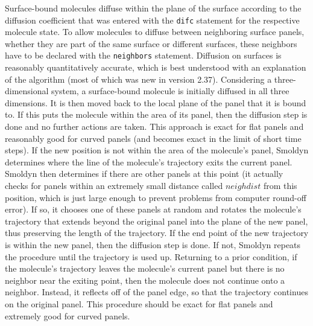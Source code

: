\documentclass {scrbook}
\newcommand {\ttt} {\texttt}
\begin{document}
Surface-bound molecules diffuse within the plane of the surface according to the diffusion coefficient that was entered with the \ttt{difc} statement for the respective molecule state. To allow molecules to diffuse between neighboring surface panels, whether they are part of the same surface or different surfaces, these neighbors have to be declared with the \ttt{neighbors} statement. Diffusion on surfaces is reasonably quantitatively accurate, which is best understood with an explanation of the algorithm (most of which was new in version 2.37). Considering a three-dimensional system, a surface-bound molecule is initially diffused in all three dimensions. It is then moved back to the local plane of the panel that it is bound to. If this puts the molecule within the area of its panel, then the diffusion step is done and no further actions are taken. This approach is exact for flat panels and reasonably good for curved panels (and becomes exact in the limit of short time steps). If the new position is not within the area of the molecule's panel, Smoldyn determines where the line of the molecule's trajectory exits the current panel. Smoldyn then determines if there are other panels at this point (it actually checks for panels within an extremely small distance called $neighdist$ from this position, which is just large enough to prevent problems from computer round-off error). If so, it chooses one of these panels at random and rotates the molecule's trajectory that extends beyond the original panel into the plane of the new panel, thus preserving the length of the trajectory. If the end point of the new trajectory is within the new panel, then the diffusion step is done. If not, Smoldyn repeats the procedure until the trajectory is used up. Returning to a prior condition, if the molecule's trajectory leaves the molecule's current panel but there is no neighbor near the exiting point, then the molecule does not continue onto a neighbor. Instead, it reflects off of the panel edge, so that the trajectory continues on the original panel. This procedure should be exact for flat panels and extremely good for curved panels.
\end{document}
